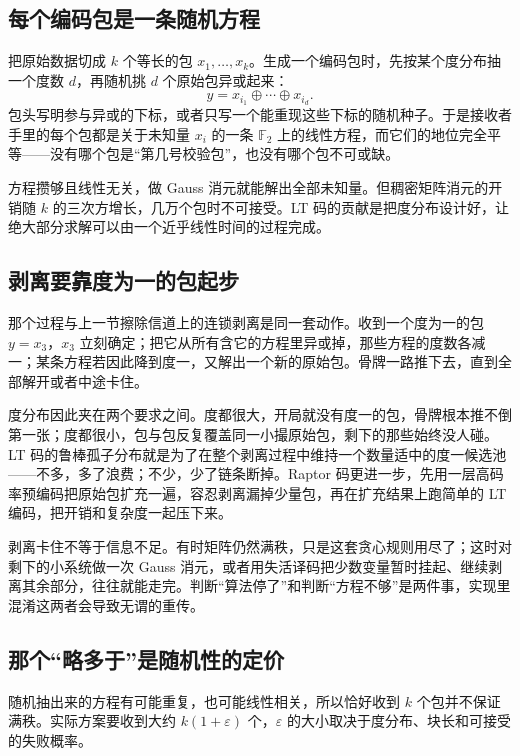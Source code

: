 \subsection{每个编码包是一条随机方程}

把原始数据切成 \(k\) 个等长的包 \(x_1,\ldots,x_k\)。生成一个编码包时，先按某个度分布抽一个度数 \(d\)，再随机挑 \(d\) 个原始包异或起来：
\[
y=x_{i_1}\oplus\cdots\oplus x_{i_d}.
\]
包头写明参与异或的下标，或者只写一个能重现这些下标的随机种子。于是接收者手里的每个包都是关于未知量 \(x_i\) 的一条 \(\mathbb F_2\) 上的线性方程，而它们的地位完全平等——没有哪个包是``第几号校验包''，也没有哪个包不可或缺。

方程攒够且线性无关，做 Gauss 消元就能解出全部未知量。但稠密矩阵消元的开销随 \(k\) 的三次方增长，几万个包时不可接受。LT 码的贡献是把度分布设计好，让绝大部分求解可以由一个近乎线性时间的过程完成。

\subsection{剥离要靠度为一的包起步}

那个过程与上一节擦除信道上的连锁剥离是同一套动作。收到一个度为一的包 \(y=x_3\)，\(x_3\) 立刻确定；把它从所有含它的方程里异或掉，那些方程的度数各减一；某条方程若因此降到度一，又解出一个新的原始包。骨牌一路推下去，直到全部解开或者中途卡住。

度分布因此夹在两个要求之间。度都很大，开局就没有度一的包，骨牌根本推不倒第一张；度都很小，包与包反复覆盖同一小撮原始包，剩下的那些始终没人碰。LT 码的鲁棒孤子分布就是为了在整个剥离过程中维持一个数量适中的度一候选池——不多，多了浪费；不少，少了链条断掉。Raptor 码更进一步，先用一层高码率预编码把原始包扩充一遍，容忍剥离漏掉少量包，再在扩充结果上跑简单的 LT 编码，把开销和复杂度一起压下来。

剥离卡住不等于信息不足。有时矩阵仍然满秩，只是这套贪心规则用尽了；这时对剩下的小系统做一次 Gauss 消元，或者用失活译码把少数变量暂时挂起、继续剥离其余部分，往往就能走完。判断``算法停了''和判断``方程不够''是两件事，实现里混淆这两者会导致无谓的重传。

\subsection{那个``略多于''是随机性的定价}

随机抽出来的方程有可能重复，也可能线性相关，所以恰好收到 \(k\) 个包并不保证满秩。实际方案要收到大约 \(k(1+\varepsilon)\) 个，\(\varepsilon\) 的大小取决于度分布、块长和可接受的失败概率。

